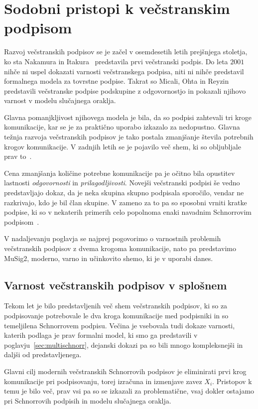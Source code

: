 \section{Sodobni pristopi k večstranskim podpisom}
\label{sec:sodobno}
Razvoj večstranskih podpisov se je začel v osemdesetih letih prejšnjega stoletja, ko sta Nakamura
in Itakura~\cite{itakura1983multi} predstavila prvi večstranski podpis. Do leta $2001$ nihče ni
uspel dokazati varnosti večstranskega podpisa, niti ni nihče predstavil formalnega modela za
tovrstne podpise. Takrat so Micali, Ohta in Reyzin~\cite{micali2001asm} predstavili večstranske
podpise podskupine z odgovornostjo in pokazali njihovo varnost v modelu slučajnega oraklja.

Glavna pomanjkljivost njihovega modela je bila, da so podpisi zahtevali tri kroge komunikacije, kar
se je za praktično uporabo izkazalo za nedopustno. Glavna težnja razvoja večstranskih podpisov je
tako postala zmanjšanje števila potrebnih krogov komunikacije. V zadnjih letih se je pojavilo več
shem, ki so obljubljale prav to~\cite{drijvers2019security, jonas2020musig2}.

Cena zmanjšanja količine potrebne komunikacije pa je očitno bila opustitev lastnosti \textit{odgovornosti}
in \textit{prilagodljivosti}. Novejši večstranski podpisi še vedno predstavljajo dokaz, da je neka
skupina skupno podpisala sporočilo, vendar ne razkrivajo, kdo je bil član skupine. V zameno za to
pa so sposobni vrniti kratke podpise, ki so v nekaterih primerih celo popolnoma enaki navadnim
Schnorrovim podpisom~\cite{jonas2020musig2}.

V nadaljevanju poglavja se najprej pogovorimo o varnostnih problemih večstranskih podpisov z dvema
krogoma komunikacije, nato pa predstavimo MuSig2, moderno, varno in učinkovito shemo, ki je v
uporabi danes.

\subsection{Varnost večstranskih podpisov v splošnem}
\label{sec:varnost}
Tekom let je bilo predstavljenih več shem večstranskih podpisov, ki so za podpisovanje potrebovale
le dva kroga komunikacije med podpisniki in so temeljilena Schnorrovem podpisu. Večina je vsebovala
tudi dokaze varnosti, katerih podlaga je prav formalni model, ki smo ga predstavili v
poglavju~\ref{sec:multischnorr}, dejanski dokazi pa so bili mnogo kompleksnejši in daljši od 
predstavljenega.

Glavni cilj modernih večstranskih Schnorrovih podpisov je eliminirati prvi krog komunikacije
pri podpisovanju, torej izračuna in izmenjave zavez $X_i$. Pristopov k temu je bilo več, prav vsi
pa so se izkazali za problematične, vsaj dokler ostajamo pri Schnorrovih podpisih in modelu
slučajnega oraklja.

